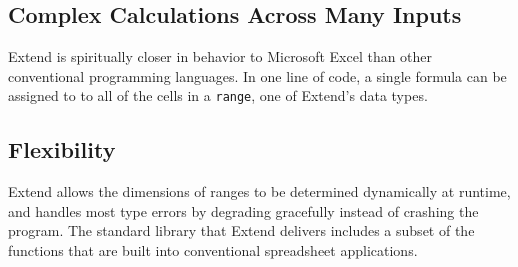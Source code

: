 	\subsection{Complex Calculations Across Many Inputs}
	Extend is spiritually closer in behavior to Microsoft Excel than other conventional programming languages. In one line of code, a single formula can be assigned to to all of the cells in a \texttt{range}, one of Extend's data types.

	\subsection{Flexibility}
	Extend allows the dimensions of ranges to be determined dynamically at runtime, and handles most type errors by degrading gracefully instead of crashing the program. The standard library that Extend delivers includes a subset of the functions that are built into conventional spreadsheet applications.
